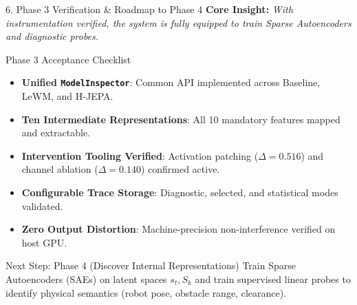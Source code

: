 \documentclass[aspectratio=169, 10pt]{beamer}
\begin{document}
\begin{frame}{6. Phase 3 Verification \& Roadmap to Phase 4}
  \textbf{Core Insight:} \textit{With instrumentation verified, the system is fully equipped to train Sparse Autoencoders and diagnostic probes.}

  \vspace{0.3cm}
  \begin{block}{Phase 3 Acceptance Checklist}
    \small
    \begin{itemize}
      \item[\checkmark] \textbf{Unified \texttt{ModelInspector}}: Common API implemented across Baseline, LeWM, and H-JEPA.
      \item[\checkmark] \textbf{Ten Intermediate Representations}: All 10 mandatory features mapped and extractable.
      \item[\checkmark] \textbf{Intervention Tooling Verified}: Activation patching ($\Delta = 0.516$) and channel ablation ($\Delta = 0.140$) confirmed active.
      \item[\checkmark] \textbf{Configurable Trace Storage}: Diagnostic, selected, and statistical modes validated.
      \item[\checkmark] \textbf{Zero Output Distortion}: Machine-precision non-interference verified on host GPU.
    \end{itemize}
  \end{block}

  \vspace{0.2cm}
  \begin{alertblock}{Next Step: Phase 4 (Discover Internal Representations)}
    \small
    Train Sparse Autoencoders (SAEs) on latent spaces $s_t, S_k$ and train supervised linear probes to identify physical semantics (robot pose, obstacle range, clearance).
  \end{alertblock}
\end{frame}
\end{document}
